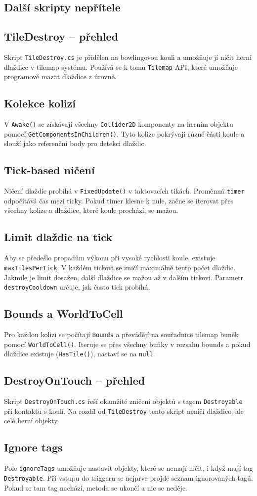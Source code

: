 \subsection{Další skripty nepřítele}

\subsection{TileDestroy -- přehled}
Skript \texttt{TileDestroy.cs} je přidělen na bowlingovou kouli a umožňuje jí ničit herní dlaždice v tilemap systému. Používá se k tomu \texttt{Tilemap} API, které umožňuje programově mazat dlaždice z úrovně.

\subsection{Kolekce kolizí}
V \texttt{Awake()} se získávají všechny \texttt{Collider2D} komponenty na herním objektu pomocí \texttt{GetComponentsInChildren()}. Tyto kolize pokrývají různé části koule a slouží jako referenční body pro detekci dlaždic.

\subsection{Tick-based ničení}
Ničení dlaždic probíhá v \texttt{FixedUpdate()} v taktovacích tikách. Proměnná \texttt{timer} odpočítává čas mezi ticky. Pokud timer klesne k nule, začne se iterovat přes všechny kolize a dlaždice, které koule prochází, se mažou.

\subsection{Limit dlaždic na tick}
Aby se předešlo propadům výkonu při vysoké rychlosti koule, existuje \texttt{maxTilesPerTick}. V každém tickovi se zničí maximálně tento počet dlaždic. Jakmile je limit dosažen, další dlaždice se mažou až v dalším tickovi. Parametr \texttt{destroyCooldown} určuje, jak často tick probíhá.

\subsection{Bounds a WorldToCell}
Pro každou kolizi se počítají \texttt{Bounds} a převádějí na souřadnice tilemap buněk pomocí \texttt{WorldToCell()}. Iteruje se přes všechny buňky v rozsahu bounds a pokud dlaždice existuje (\texttt{HasTile()}), nastaví se na \texttt{null}.

\subsection{DestroyOnTouch -- přehled}
Skript \texttt{DestroyOnTouch.cs} řeší okamžité zničení objektů s tagem \texttt{Destroyable} při kontaktu s koulí. Na rozdíl od \texttt{TileDestroy} tento skript neničí dlaždice, ale celé herní objekty.

\subsection{Ignore tags}
Pole \texttt{ignoreTags} umožňuje nastavit objekty, které se nemají ničit, i když mají tag \texttt{Destroyable}. Při vstupu do triggeru se nejprve projde seznam ignorovaných tagů. Pokud se tam tag nachází, metoda se ukončí a nic se neděje.
